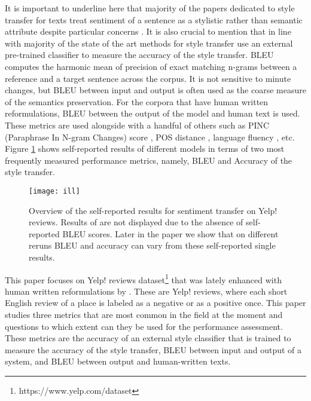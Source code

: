 \documentclass[11pt,a4paper]{article}
\begin{document}
It is important to underline here that majority of the papers dedicated to style transfer for texts treat sentiment of a sentence as a stylistic rather than semantic attribute despite particular concerns \cite{TYwrong}. It is also crucial to mention that in line with \cite{fu2} majority of the state of the art methods for style transfer use an external pre-trained classifier to measure the accuracy of the style transfer. BLEU computes the harmonic mean of precision of exact matching n-grams between a reference and a target sentence across the corpus. It is not sensitive to minute changes, but BLEU between input and output is often used as the coarse measure of the semantics preservation. For the corpora that have human written reformulations, BLEU between the output of the model and human text is used. These metrics are used alongside with a handful of others such as PINC (Paraphrase In N-gram Changes) score \cite{Carlson}, POS distance \cite{tian18}, language fluency \cite{john18}, etc. Figure \ref{pic:il} shows self-reported results of different models in terms of two most frequently measured performance metrics, namely, BLEU and Accuracy of the style transfer. 

\begin{figure}[ht]
\begin{center}
\centerline{\texttt{[image: ill]}}
\caption{Overview of the self-reported results for sentiment transfer on Yelp! reviews. Results of \cite{romanov18} are not displayed due to the absence of self-reported BLEU scores. Later in the paper we show that on different reruns BLEU and accuracy can vary from these self-reported single results.}
\label{pic:il}
\end{center}
\end{figure}


This paper focuses on Yelp! reviews dataset\footnote{https://www.yelp.com/dataset} that was lately enhanced with human written reformulations by \cite{li}. These are Yelp! reviews, where each short English review of a place is labeled as a negative or as a positive once. This paper studies three metrics that are most common in the field at the moment and questions to which extent can they be used for the performance assessment. These metrics are the accuracy of an external style classifier that is trained to measure the accuracy of the style transfer, BLEU between input and output of a system, and BLEU between output and human-written texts. 
\end{document}
